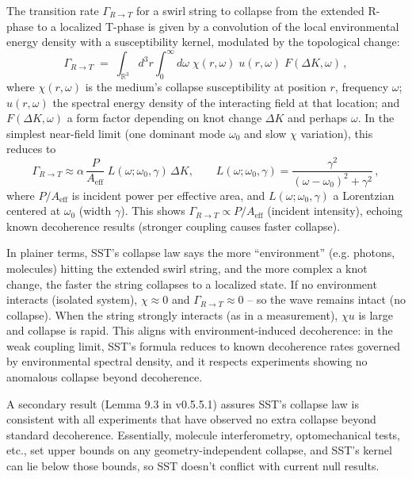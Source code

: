 \documentclass[10pt,reprint,aps,onecolumn,nofootinbib]{revtex4-2}
\begin{document}
\begin{tcolorbox}[title=Theorem 8.1: R$\to$T Transition Dynamics (Collapse Rate)]
    The transition rate $\Gamma_{R\to T}$ for a swirl string to collapse from the extended R-phase to a localized T-phase is given by a convolution of the local environmental energy density with a susceptibility kernel, modulated by the topological change:
    \[
        \Gamma_{R\to T} \;=\; \int_{\mathbb{R}^3}\! d^3r \int_0^{\infty}\! d\omega\;\chi(r,\omega)\;u(r,\omega)\;F(\Delta K,\omega)\,,
    \]
    where $\chi(r,\omega)$ is the medium’s collapse susceptibility at position $r$, frequency $\omega$; $u(r,\omega)$ the spectral energy density of the interacting field at that location; and $F(\Delta K,\omega)$ a form factor depending on knot change $\Delta K$ and perhaps $\omega$. In the simplest near-field limit (one dominant mode $\omega_0$ and slow $\chi$ variation), this reduces to
    \[
        \Gamma_{R\to T} \approx \alpha\, \frac{P}{A_{\text{eff}}}\; L(\omega; \omega_0,\gamma)\,\Delta K, \qquad
        L(\omega; \omega_0,\gamma) = \frac{\gamma^2}{(\omega-\omega_0)^2+\gamma^2}\,,
    \]
    where $P/A_{\text{eff}}$ is incident power per effective area, and $L(\omega; \omega_0,\gamma)$ a Lorentzian centered at $\omega_0$ (width $\gamma$). This shows $\Gamma_{R\to T} \propto P/A_{\text{eff}}$ (incident intensity), echoing known decoherence results (stronger coupling causes faster collapse).
\end{tcolorbox}

\noindent In plainer terms, SST’s collapse law says the more “environment” (e.g. photons, molecules) hitting the extended swirl string, and the more complex a knot change, the faster the string collapses to a localized state. If no environment interacts (isolated system), $\chi \approx 0$ and $\Gamma_{R\to T}\approx 0$ – so the wave remains intact (no collapse). When the string strongly interacts (as in a measurement), $\chi u$ is large and collapse is rapid. This aligns with environment-induced decoherence: in the weak coupling limit, SST’s formula reduces to known decoherence rates governed by environmental spectral density, and it respects experiments showing no anomalous collapse beyond decoherence.

A secondary result (Lemma 9.3 in v0.5.5.1) assures SST’s collapse law is consistent with all experiments that have observed no extra collapse beyond standard decoherence. Essentially, molecule interferometry, optomechanical tests, etc., set upper bounds on any geometry-independent collapse, and SST’s kernel can lie below those bounds, so SST doesn’t conflict with current null results.
\end{document}
